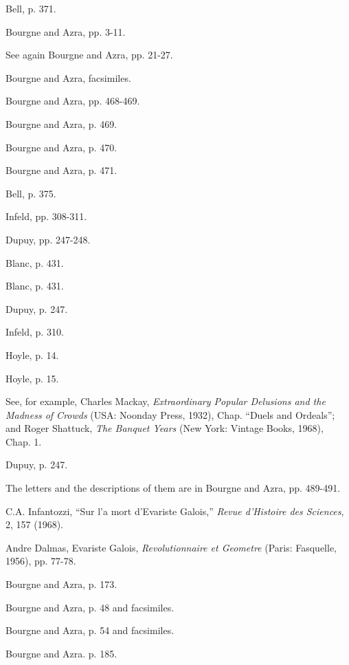 \documentclass[12pt]{article}
\begin{document}
\begin{thebibliography}{9999}
 Bell, p. 371. 

 Bourgne and Azra, pp. 3-11. 

 See again Bourgne and Azra, pp. 21-27. 

 Bourgne and Azra, facsimiles. 

 Bourgne and Azra, pp. 468-469. 

 Bourgne and Azra, p. 469. 

 Bourgne and Azra, p. 470. 

 Bourgne and Azra, p. 471. 

 Bell, p. 375. 

 Infeld, pp. 308-311. 

 Dupuy, pp. 247-248. 

 Blanc, p. 431. 

 Blanc, p. 431. 

 Dupuy, p. 247. 

 Infeld, p. 310. 

 Hoyle, p. 14. 

 Hoyle, p. 15. 

 See, for example, Charles Mackay, \emph{Extraordinary Popular Delusions and the Madness of Crowds} (USA: Noonday Press, 1932), Chap. ``Duels and Ordeals''; and Roger Shattuck, \emph{The Banquet Years} (New York: Vintage Books, 1968), Chap. 1. 

 Dupuy, p. 247. 

 The letters and the descriptions of them are in Bourgne and Azra, pp. 489-491. 

 C.A. Infantozzi, ``Sur l'a mort d'Evariste Galois,'' {\it Revue d'Histoire des Sciences}, 2, 157 (1968). 

 Andre Dalmas, Evariste Galois, {\it Revolutionnaire et Geometre} (Paris: Fasquelle, 1956), pp. 77-78. 

 Bourgne and Azra, p. 173. 

 Bourgne and Azra, p. 48 and facsimiles. 

 Bourgne and Azra, p. 54 and facsimiles. 

 Bourgne and Azra. p. 185.  
\end{thebibliography}
\end{document}
